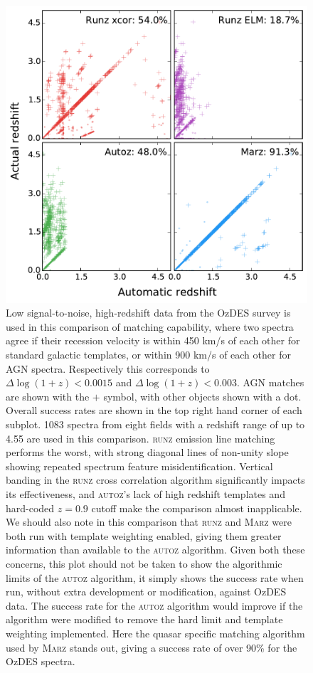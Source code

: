 \documentclass[5p]{elsarticle}
\newcommand{\runz}{\textsc{runz}}
\newcommand{\autoz}{\textsc{autoz}}
\newcommand{\marz}{\textsc{Marz}}
\begin{document}
\begin{figure}[h]
\centering
\includegraphics[width=\columnwidth]{run009Comp.pdf}
\caption{Low signal-to-noise, high-redshift data from the OzDES survey is used in this comparison of matching capability, where two spectra agree if their recession velocity is within 450 km/s of each other for standard galactic templates, or within 900 km/s of each other for AGN spectra. Respectively this corresponds to $\Delta \log(1+z) < 0.0015$ and $\Delta \log(1+z) < 0.003$. AGN matches are shown with the $+$ symbol, with other objects shown with a dot. Overall success rates are shown in the top right hand corner of each subplot. 1083 spectra from eight fields with a redshift range of up to 4.55 are used in this comparison. \runz{} emission line matching performs the worst, with strong diagonal lines of non-unity slope showing repeated spectrum feature misidentification. Vertical banding in the \runz{} cross correlation algorithm significantly impacts its effectiveness, and \autoz{}'s lack of high redshift templates and hard-coded $z=0.9$ cutoff make the comparison almost inapplicable. We should also note in this comparison that \runz{} and \marz{} were both run with template weighting enabled, giving them greater information than available to the \autoz{} algorithm. Given both these concerns, this plot should not be taken to show the algorithmic limits of the \autoz{} algorithm, it simply shows the success rate when run, without extra development or modification, against OzDES data. The success rate for the \autoz{} algorithm would improve if the algorithm were modified to remove the hard limit and template weighting implemented. Here the quasar specific matching algorithm used by \marz{} stands out, giving a success rate of over 90\% for the OzDES spectra.}
\label{fig:low}
\end{figure}
\end{document}
